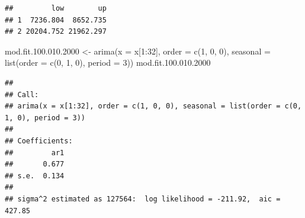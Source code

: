\documentclass[
]{book}
\newenvironment{Shaded}{\begin{snugshade}}{\end{snugshade}}
\newcommand{\AttributeTok}[1]{\textcolor[rgb]{0.77,0.63,0.00}{#1}}
\newcommand{\ConstantTok}[1]{\textcolor[rgb]{0.00,0.00,0.00}{#1}}
\newcommand{\DecValTok}[1]{\textcolor[rgb]{0.00,0.00,0.81}{#1}}
\newcommand{\FloatTok}[1]{\textcolor[rgb]{0.00,0.00,0.81}{#1}}
\newcommand{\FunctionTok}[1]{\textcolor[rgb]{0.00,0.00,0.00}{#1}}
\newcommand{\NormalTok}[1]{#1}
\newcommand{\OtherTok}[1]{\textcolor[rgb]{0.56,0.35,0.01}{#1}}
\newcommand{\SpecialCharTok}[1]{\textcolor[rgb]{0.00,0.00,0.00}{#1}}
\theoremstyle{definition}
\theoremstyle{definition}
\theoremstyle{definition}
\theoremstyle{definition}
\theoremstyle{remark}
\begin{document}
\begin{Shaded}
\end{Shaded}

\begin{verbatim}
##         low        up
## 1  7236.804  8652.735
## 2 20204.752 21962.297
\end{verbatim}

\begin{Shaded}
\begin{Highlighting}[]
\NormalTok{ mod.fit.}\DecValTok{100}\NormalTok{.}\FloatTok{010.2000} \OtherTok{\textless{}{-}} \FunctionTok{arima}\NormalTok{(}\AttributeTok{x =}\NormalTok{ x[}\DecValTok{1}\SpecialCharTok{:}\DecValTok{32}\NormalTok{], }\AttributeTok{order =} \FunctionTok{c}\NormalTok{(}\DecValTok{1}\NormalTok{, }\DecValTok{0}\NormalTok{, }\DecValTok{0}\NormalTok{), }\AttributeTok{seasonal =} \FunctionTok{list}\NormalTok{(}\AttributeTok{order =} \FunctionTok{c}\NormalTok{(}\DecValTok{0}\NormalTok{, }\DecValTok{1}\NormalTok{, }\DecValTok{0}\NormalTok{), }\AttributeTok{period =} \DecValTok{3}\NormalTok{))}
\NormalTok{  mod.fit.}\DecValTok{100}\NormalTok{.}\FloatTok{010.2000}
\end{Highlighting}
\end{Shaded}

\begin{verbatim}
## 
## Call:
## arima(x = x[1:32], order = c(1, 0, 0), seasonal = list(order = c(0, 1, 0), period = 3))
## 
## Coefficients:
##         ar1
##       0.677
## s.e.  0.134
## 
## sigma^2 estimated as 127564:  log likelihood = -211.92,  aic = 427.85
\end{verbatim}
\end{document}

